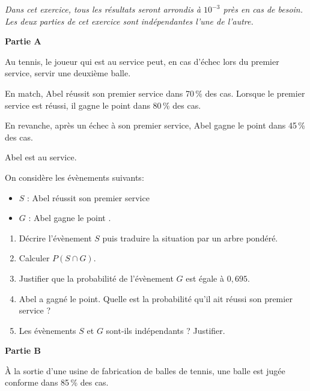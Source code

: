 \medskip

\emph{Dans cet exercice, tous les résultats seront arrondis à $10^{-3}$ près en cas de besoin.\\
Les deux parties de cet exercice sont indépendantes l'une de l'autre.}

\bigskip

\textbf{Partie A}

\medskip

Au tennis, le joueur qui est au service peut, en cas d'échec lors du premier service, servir une deuxième balle.

En match, Abel réussit son premier service dans 70\,\% des cas. Lorsque le premier service est réussi, il gagne le point dans 80\,\% des cas.

En revanche, après un échec à son premier service, Abel gagne
le point dans 45\,\% des cas.

\medskip

Abel est au service.

On considère les évènements suivants:

\begin{itemize}[label=$\bullet~~$]
\item $S$ : \og Abel réussit son premier service \fg
\item $G$ : \og Abel gagne le point \fg.
\end{itemize}

\medskip

\begin{enumerate}
\item Décrire l'évènement $S$ puis traduire la situation par un arbre pondéré.
\item Calculer $P(S \cap G)$.
\item Justifier que la probabilité de l'évènement $G$ est égale à $0,695$.
\item Abel a gagné le point. Quelle est la probabilité qu'il ait réussi son premier service ?
\item Les évènements $S$ et $G$ sont-ils indépendants ? Justifier.
\end{enumerate}

\textbf{Partie B}

\medskip

À la sortie d'une usine de fabrication de balles de tennis, une balle est jugée conforme dans 85\,\% des cas.

\medskip

